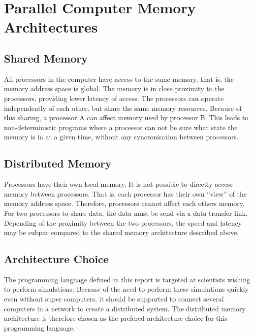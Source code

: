\chapter{Parallel Computer Memory Architectures}

\section{Shared Memory}

All processors in the computer have access to the same memory, that is, the memory address space is global. The memory is in close proximity to the processors, providing lower latency of access. The processors can operate independently of each other, but share the same memory resources. Because of this sharing, a processor A can affect memory used by processor B. This leads to non-deterministic programs where a processor can not be sure what state the memory is in at a given time, without any syncronisation between processors.

\section{Distributed Memory}

Processors have their own local memory. It is not possible to directly access memory between processors. That is, each processor has their own \enquote{view} of the memory address space. Therefore, processors cannot affect each others memory. For two processors to share data, the data must be send via a data transfer link. Depending of the proximity between the two processors, the speed and latency may be subpar compared to the shared memory architecture described above.

\section{Architecture Choice}

The programming language defined in this report is targeted at scientists wishing to perform simulations. Because of the need to perform these simulations quickly even without super computers, it should be supported to connect several computers in a network to create a distributed system. The distributed memory architecture is therefore chosen as the prefered architecture choice for this programming language.
